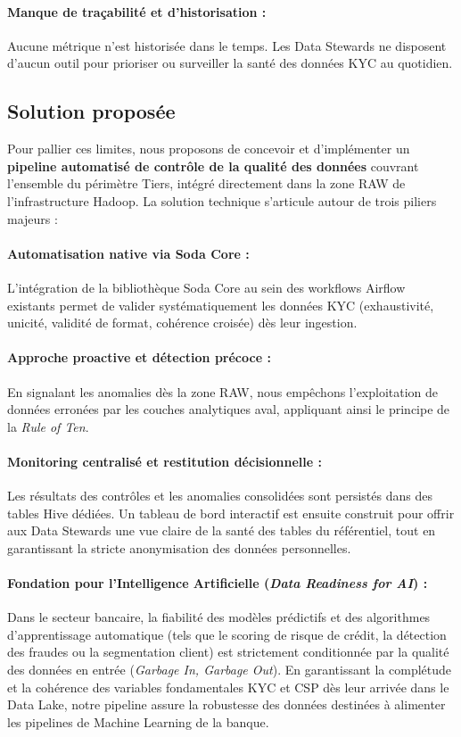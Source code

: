 \paragraph{Manque de traçabilité et d'historisation :} Aucune métrique n'est historisée dans le temps. Les Data Stewards ne disposent d'aucun outil pour prioriser ou surveiller la santé des données KYC au quotidien.

\subsection{Solution proposée}
Pour pallier ces limites, nous proposons de concevoir et d'implémenter un \textbf{pipeline automatisé de contrôle de la qualité des données} couvrant l'ensemble du périmètre Tiers, intégré directement dans la zone RAW de l'infrastructure Hadoop. La solution technique s'articule autour de trois piliers majeurs :

\paragraph{Automatisation native via Soda Core :} L'intégration de la bibliothèque Soda Core au sein des workflows Airflow existants permet de valider systématiquement les données KYC (exhaustivité, unicité, validité de format, cohérence croisée) dès leur ingestion.

\paragraph{Approche proactive et détection précoce :} En signalant les anomalies dès la zone RAW, nous empêchons l'exploitation de données erronées par les couches analytiques aval, appliquant ainsi le principe de la \textit{Rule of Ten}.

\paragraph{Monitoring centralisé et restitution décisionnelle :} Les résultats des contrôles et les anomalies consolidées sont persistés dans des tables Hive dédiées. Un tableau de bord interactif est ensuite construit pour offrir aux Data Stewards une vue claire de la santé des tables du référentiel, tout en garantissant la stricte anonymisation des données personnelles.

\paragraph{Fondation pour l'Intelligence Artificielle (\textit{Data Readiness for AI}) :} Dans le secteur bancaire, la fiabilité des modèles prédictifs et des algorithmes d'apprentissage automatique (tels que le scoring de risque de crédit, la détection des fraudes ou la segmentation client) est strictement conditionnée par la qualité des données en entrée (\textit{Garbage In, Garbage Out}). En garantissant la complétude et la cohérence des variables fondamentales KYC et CSP dès leur arrivée dans le Data Lake, notre pipeline assure la robustesse des données destinées à alimenter les pipelines de Machine Learning de la banque.

